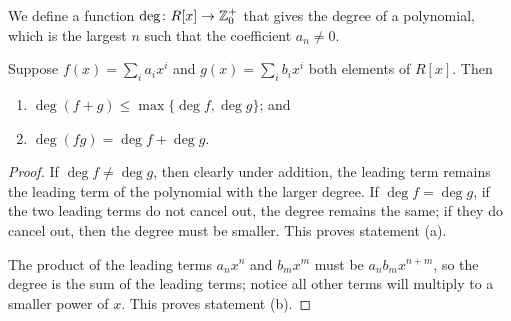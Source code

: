 \begin{definition}
    We define a function \(\deg\colon R[x]\to\mathbb{Z}_0^+\)
    that gives the degree of a polynomial,
    which is the largest \(n\) such that the coefficient \(a_n \neq 0\).
\end{definition}
\begin{lemma}\label{lem:degree-arithmetic}
    Suppose \(f(x) = \sum_i a_i x^i\) and \(g(x) = \sum_i b_i x^i\)
    both elements of \(R[x]\). Then
    \begin{enumerate}[label={(\alph*)}, itemsep=0mm]
        \item \(\deg (f+g) \leq \max\{\deg f, \deg g\}\); and
        \item \(\deg (fg) = \deg f + \deg g\).
    \end{enumerate}
\end{lemma}
\begin{proof}
    If \(\deg f \neq \deg g\), then clearly under addition,
    the leading term remains
    the leading term of the polynomial with the larger degree.
    If \(\deg f = \deg g\),
    if the two leading terms do not cancel out,
    the degree remains the same;
    if they do cancel out,
    then the degree must be smaller.
    This proves statement (a).

    The product of the leading terms \(a_n x^n\) and \(b_m x^m\)
    must be \(a_n b_m x^{n+m}\),
    so the degree is the sum of the leading terms;
    notice all other terms will multiply to a smaller power of \(x\).
    This proves statement (b).
\end{proof}

